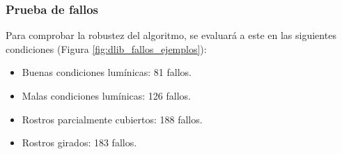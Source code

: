 \subsubsection{Prueba de fallos}

Para comprobar la robustez del algoritmo, se evaluará a este en las siguientes condiciones (Figura \ref{fig:dlib_fallos_ejemplos}):

\begin{itemize}
    \item Buenas condiciones lumínicas: 81 fallos.
    \item Malas condiciones lumínicas: 126 fallos.
    \item Rostros parcialmente cubiertos: 188 fallos.
    \item Rostros girados: 183 fallos.
\end{itemize}

